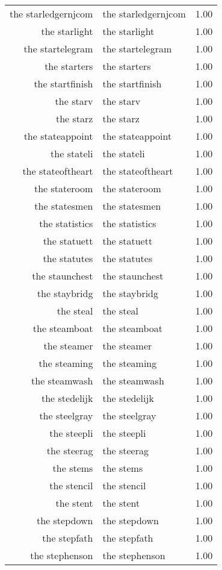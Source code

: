 \begin{table}[ht]
\begin{tabular}{rlr}
  the starledgernjcom & the starledgernjcom & 1.00 \\ 
  the starlight & the starlight & 1.00 \\ 
  the startelegram & the startelegram & 1.00 \\ 
  the starters & the starters & 1.00 \\ 
  the startfinish & the startfinish & 1.00 \\ 
  the starv & the starv & 1.00 \\ 
  the starz & the starz & 1.00 \\ 
  the stateappoint & the stateappoint & 1.00 \\ 
  the stateli & the stateli & 1.00 \\ 
  the stateoftheart & the stateoftheart & 1.00 \\ 
  the stateroom & the stateroom & 1.00 \\ 
  the statesmen & the statesmen & 1.00 \\ 
  the statistics & the statistics & 1.00 \\ 
  the statuett & the statuett & 1.00 \\ 
  the statutes & the statutes & 1.00 \\ 
  the staunchest & the staunchest & 1.00 \\ 
  the staybridg & the staybridg & 1.00 \\ 
  the steal & the steal & 1.00 \\ 
  the steamboat & the steamboat & 1.00 \\ 
  the steamer & the steamer & 1.00 \\ 
  the steaming & the steaming & 1.00 \\ 
  the steamwash & the steamwash & 1.00 \\ 
  the stedelijk & the stedelijk & 1.00 \\ 
  the steelgray & the steelgray & 1.00 \\ 
  the steepli & the steepli & 1.00 \\ 
  the steerag & the steerag & 1.00 \\ 
  the stems & the stems & 1.00 \\ 
  the stencil & the stencil & 1.00 \\ 
  the stent & the stent & 1.00 \\ 
  the stepdown & the stepdown & 1.00 \\ 
  the stepfath & the stepfath & 1.00 \\ 
  the stephenson & the stephenson & 1.00 \\ 

\end{tabular}
\end{table}
